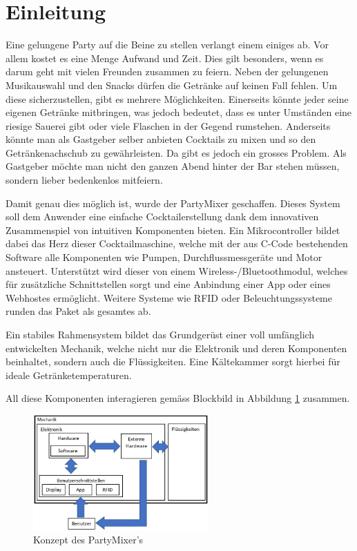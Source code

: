 \clearpage
\section{Einleitung}
\label{sec:Einleitung}

Eine gelungene Party auf die Beine zu stellen verlangt einem einiges ab. Vor allem kostet es eine Menge Aufwand und Zeit. Dies gilt besonders, wenn es darum geht mit vielen Freunden zusammen zu feiern. Neben der gelungenen Musikauswahl und den Snacks dürfen die Getränke auf keinen Fall fehlen. Um diese sicherzustellen, gibt es mehrere Möglichkeiten. Einerseits könnte jeder seine eigenen Getränke mitbringen, was jedoch bedeutet, dass es unter Umständen eine riesige Sauerei gibt oder viele Flaschen in der Gegend rumstehen. Anderseits könnte man als Gastgeber selber anbieten Cocktails zu mixen und so den Getränkenachschub zu gewährleisten. Da gibt es jedoch ein grosses Problem. Als Gastgeber möchte man nicht den ganzen Abend hinter der Bar stehen müssen, sondern lieber bedenkenlos mitfeiern.

Damit genau dies möglich ist, wurde der PartyMixer geschaffen. Dieses System soll dem Anwender eine einfache Cocktailerstellung dank dem innovativen Zusammenspiel von intuitiven Komponenten bieten. Ein Mikrocontroller bildet dabei das Herz dieser Cocktailmaschine, welche mit der aus C-Code bestehenden Software alle Komponenten wie Pumpen, Durchflussmessgeräte und Motor ansteuert. Unterstützt wird dieser von einem Wireless-/Bluetoothmodul, welches für zusätzliche Schnittstellen sorgt und eine Anbindung einer App oder eines Webhostes ermöglicht. Weitere Systeme wie RFID oder Beleuchtungssysteme runden das Paket als gesamtes ab. 

Ein stabiles Rahmensystem bildet das Grundgerüst einer voll umfänglich entwickelten Mechanik, welche nicht nur die Elektronik und deren Komponenten beinhaltet, sondern auch die Flüssigkeiten. Eine Kältekammer sorgt hierbei für ideale Getränketemperaturen. 

All diese Komponenten interagieren gemäss Blockbild in Abbildung \ref{fig:Konzept_Partymixer} zusammen.


\begin{figure}[h!]
\center
\includegraphics[width = 0.6\textwidth]{graphics/Konzept}
\caption{Konzept des PartyMixer's}
\label{fig:Konzept_Partymixer}
\end{figure}

